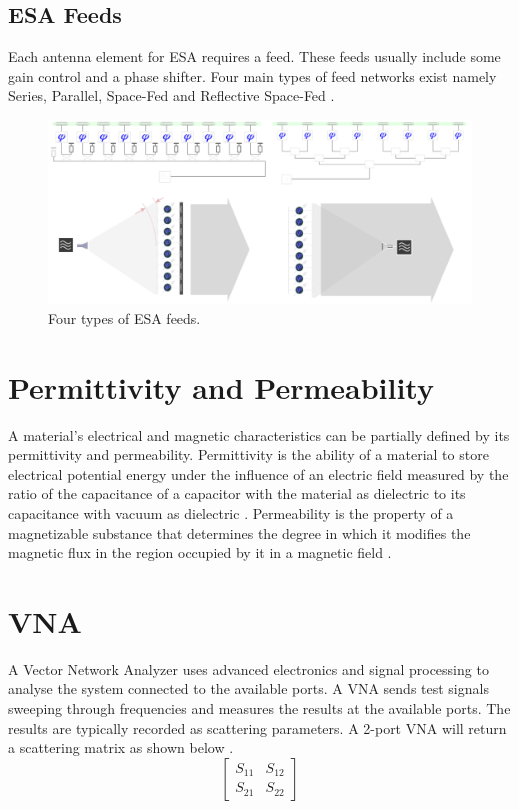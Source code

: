 \subsection{ESA Feeds}
Each antenna element for ESA requires a feed. These feeds usually include some gain control and a phase shifter. Four main types of feed networks exist namely Series, Parallel, Space-Fed and Reflective Space-Fed \cite{ESAfeed}. 

    \begin{figure}[H]
    \centering
    \includegraphics[width=0.8\linewidth]{Figures/chp2_ESA_feeds.png}
    \caption{Four types of ESA feeds.}
    \label{fig:chp2_ESA_feeds}
    \end{figure}

\section{Permittivity and Permeability}
A material’s electrical and magnetic characteristics can be partially defined by its permittivity and permeability. Permittivity is the ability of a material to store electrical potential energy under the influence of an electric field measured by the ratio of the capacitance of a capacitor with the material as dielectric to its capacitance with vacuum as dielectric \cite{Permittivty}. Permeability is the property of a magnetizable substance that determines the degree in which it modifies the magnetic flux in the region occupied by it in a magnetic field \cite{Permeability}. 

\section{VNA}
A Vector Network Analyzer uses advanced electronics and signal processing to analyse the system connected to the available ports. A VNA sends test signals sweeping through frequencies and measures the results at the available ports. The results are typically recorded as scattering parameters. A 2-port VNA will return a scattering matrix as shown below \cite{Sparams}. 
    \[\begin{bmatrix}
    S_{11} &  S_{12}\\
    S_{21} & S_{22}
    \end{bmatrix}\]

